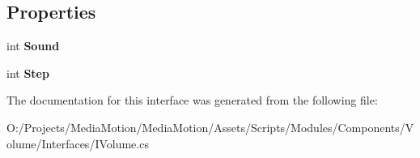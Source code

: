 \subsection*{Properties}
\begin{DoxyCompactItemize}
\item 
\hypertarget{interface_media_motion_1_1_modules_1_1_components_1_1_volume_1_1_i_volume_af7b1970ffa7e18357bf3af3597e9e014}{int {\bfseries Sound}}\label{interface_media_motion_1_1_modules_1_1_components_1_1_volume_1_1_i_volume_af7b1970ffa7e18357bf3af3597e9e014}

\item 
\hypertarget{interface_media_motion_1_1_modules_1_1_components_1_1_volume_1_1_i_volume_aec2c2cfe378cc0e99477d26a1e346f96}{int {\bfseries Step}}\label{interface_media_motion_1_1_modules_1_1_components_1_1_volume_1_1_i_volume_aec2c2cfe378cc0e99477d26a1e346f96}

\end{DoxyCompactItemize}


The documentation for this interface was generated from the following file\+:\begin{DoxyCompactItemize}
\item 
O\+:/\+Projects/\+Media\+Motion/\+Media\+Motion/\+Assets/\+Scripts/\+Modules/\+Components/\+Volume/\+Interfaces/I\+Volume.\+cs\end{DoxyCompactItemize}
